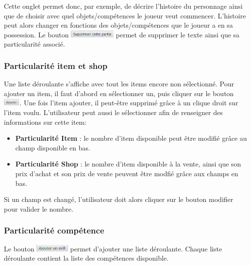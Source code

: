 			Cette onglet permet donc, par exemple, de décrire l'histoire du personnage ainsi que de choisir avec quel objets/compétences le joueur veut commencer. L'histoire peut alors changer en fonctions des objets/compétences que le joueur a en sa possession.
			Le bouton \includegraphics[height=10pt]{img/preludeSupprimerBouton.png} permet de supprimer le texte ainsi que sa particularité associé.

			\subsubsection{Particularité item et shop} \label{subsubsection:Item/Shop}
				Une liste déroulante s'affiche avec tout les items encore non sélectionné. Pour ajouter un item, il faut d'abord en sélectionner un, puis cliquer sur le bouton \includegraphics[height=10pt]{img/ajouterBouton.png}. Une fois l'item ajouter, il peut-être supprimé grâce à un clique droit sur l'item voulu.
				L'utilisateur peut aussi le sélectionner afin de renseigner des informations sur cette item:
				\begin{itemize}
					\item \textbf{Particularité Item} : le nombre d'item disponible peut être modifié grâce au champ disponible en bas.
					\item \textbf{Particularité Shop} : le nombre d'item disponible à la vente, ainsi que son prix d'achat et son prix de vente peuvent être modfié grâce aux champs en bas.
				\end{itemize}
				Si un champ est changé, l'utilisateur doit alors cliquer sur le bouton modifier pour valider le nombre.

			\subsubsection{Particularité compétence} \label{subsubsection:compétences}
				Le bouton \includegraphics[height=10pt]{img/preludeAjouterSkillBouton.png} permet d'ajouter une liste déroulante. Chaque liste déroulante contient la liste des compétences disponible.

